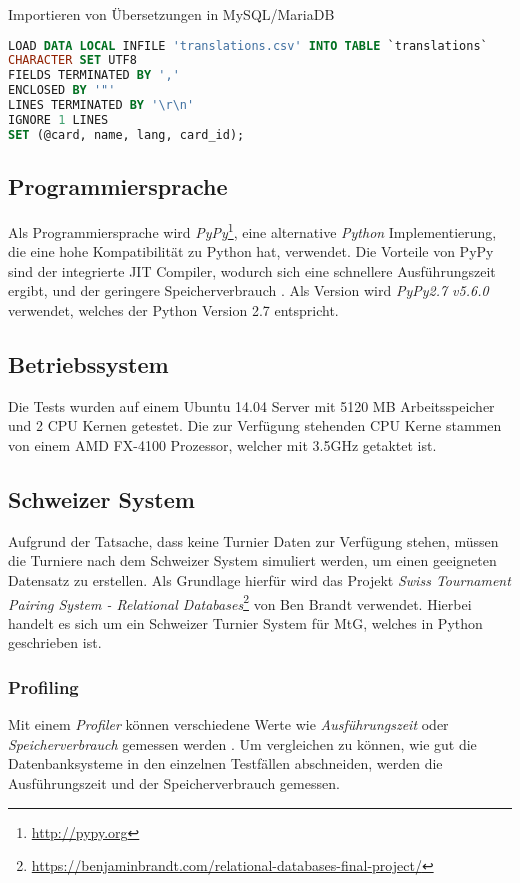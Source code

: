 \begin{listing}[t]
    \caption{Importieren von Übersetzungen in MySQL/MariaDB}
    \label{listing:sql.import.csv}
    \begin{lstlisting}[language=SQL]
LOAD DATA LOCAL INFILE 'translations.csv' INTO TABLE `translations`
CHARACTER SET UTF8
FIELDS TERMINATED BY ','
ENCLOSED BY '"'
LINES TERMINATED BY '\r\n'
IGNORE 1 LINES
SET (@card, name, lang, card_id);
    \end{lstlisting}
\end{listing}

\subsection{Programmiersprache}
Als Programmiersprache wird \emph{PyPy}\footnote{\url{http://pypy.org}}, eine alternative \emph{Python} Implementierung, die eine hohe Kompatibilität zu Python hat, verwendet. Die Vorteile von PyPy sind der integrierte \ac{JIT} Compiler, wodurch sich eine schnellere Ausführungszeit ergibt, und der geringere Speicherverbrauch \cite{doglio2015mastering}. Als Version wird \emph{PyPy2.7 v5.6.0} verwendet, welches der Python Version 2.7 entspricht.

\subsection{Betriebssystem}
Die Tests wurden auf einem Ubuntu 14.04 Server mit 5120 MB Arbeitsspeicher und 2 CPU Kernen getestet. Die zur Verfügung stehenden CPU Kerne stammen von einem AMD FX-4100 Prozessor, welcher mit 3.5GHz getaktet ist.

\subsection{Schweizer System}
Aufgrund der Tatsache, dass keine Turnier Daten zur Verfügung stehen, müssen die Turniere nach dem Schweizer System simuliert werden, um einen geeigneten Datensatz zu erstellen. Als Grundlage hierfür wird das Projekt \emph{Swiss Tournament Pairing System - Relational Databases}\footnote{\url{https://benjaminbrandt.com/relational-databases-final-project/}} von Ben Brandt verwendet. Hierbei handelt es sich um ein Schweizer Turnier System für \ac{MtG}, welches in Python geschrieben ist.

\subsubsection{Profiling}
Mit einem \emph{Profiler} können verschiedene Werte wie \emph{Ausführungszeit} oder \emph{Speicherverbrauch} gemessen werden \cite{doglio2015mastering}. Um vergleichen zu können, wie gut die Datenbanksysteme in den einzelnen Testfällen abschneiden, werden die Ausführungszeit und der Speicherverbrauch gemessen. 

